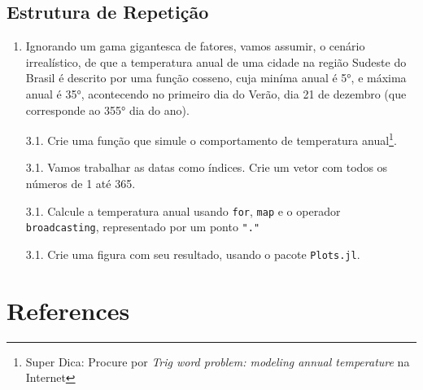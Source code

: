 \documentclass[
  letterpaper,
  DIV=11,
  numbers=noendperiod]{scrreprt}
\newlength{\cslhangindent}
\newlength{\cslentryspacingunit} %
\newenvironment{CSLReferences}[2] %
 {%
  \setlength{\parindent}{0pt}
  \ifodd #1
  \let\oldpar\par
  \def\par{\hangindent=\cslhangindent\oldpar}
  \fi
  \setlength{\parskip}{#2\cslentryspacingunit}
 }%
 {}
\begin{document}
\hypertarget{estrutura-de-repetiuxe7uxe3o}{%
\section{Estrutura de Repetição}\label{estrutura-de-repetiuxe7uxe3o}}

\begin{enumerate}
\def\labelenumi{\arabic{enumi}.}
\setcounter{enumi}{2}
\item
  Ignorando um gama gigantesca de fatores, vamos assumir, o cenário
  irrealístico, de que a temperatura anual de uma cidade na região
  Sudeste do Brasil é descrito por uma função cosseno, cuja miníma anual
  é 5°, e máxima anual é 35°, acontecendo no primeiro dia do Verão, dia
  21 de dezembro (que corresponde ao 355° dia do ano).

  3.1. Crie uma função que simule o comportamento de temperatura
  anual\footnote{Super Dica: Procure por \emph{Trig word problem:
    modeling annual temperature} na Internet}.

  3.1. Vamos trabalhar as datas como índices. Crie um vetor com todos os
  números de 1 até 365.

  3.1. Calcule a temperatura anual usando \texttt{for}, \texttt{map} e o
  operador \texttt{broadcasting}, representado por um ponto \texttt{"."}

  3.1. Crie uma figura com seu resultado, usando o pacote
  \texttt{Plots.jl}.
\end{enumerate}


\hypertarget{references}{%
\chapter*{References}\label{references}}

\hypertarget{refs}{}
\begin{CSLReferences}{0}{0}
\end{CSLReferences}
\end{document}
